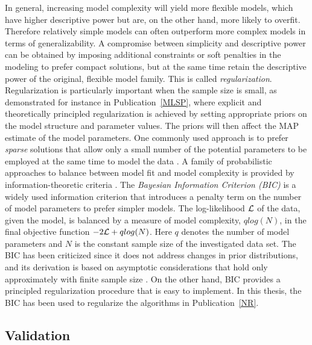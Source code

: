 In general, increasing model complexity will yield more flexible
models, which have higher descriptive power but are, on the other hand, more likely
to overfit. Therefore relatively simple models can often outperform
more complex models in terms of generalizability. A compromise between
simplicity and descriptive power can be obtained by imposing
additional constraints or soft penalties in the modeling to prefer
compact solutions, but at the same time retain the descriptive power
of the original, flexible model family.  This is called {\it
  regularization}. Regularization is particularly important when the
sample size is small, as demonstrated for instance in
Publication~\ref{MLSP}, where explicit and theoretically principled
regularization is achieved by setting appropriate priors on the model
structure and parameter values. The priors will then affect the MAP
estimate of the model parameters. One commonly used approach is to
prefer {\it sparse} solutions that allow only a small number of the
potential parameters to be employed at the same time to model the data
\citep[see e.g.][]{Archambeau08}. A family of probabilistic approaches
to balance between model fit and model complexity is provided by
information-theoretic criteria \citep[see e.g.][]{Gelman03}. The {\it
  Bayesian Information Criterion (BIC)} is a widely used information
criterion that introduces a penalty term on the number of model
parameters to prefer simpler models. The log-likelihood \({\cal L}\) of the
data, given the model, is balanced by a measure of model complexity,
\(q log(N)\), in the final objective function \(- 2{\cal L} + q
log(N)\). Here \(q\) denotes the number of model parameters and \(N\)
is the constant sample size of the investigated data set. The BIC has
been criticized since it does not address changes in prior
distributions, and its derivation is based on asymptotic
considerations that hold only approximately with finite sample size
\citep[see e.g.][]{Bishop06}. On the other hand, BIC provides a
principled regularization procedure that is easy to implement. In this
thesis, the BIC has been used to regularize the algorithms in
Publication~\ref{NR}.

\subsection{Validation}

